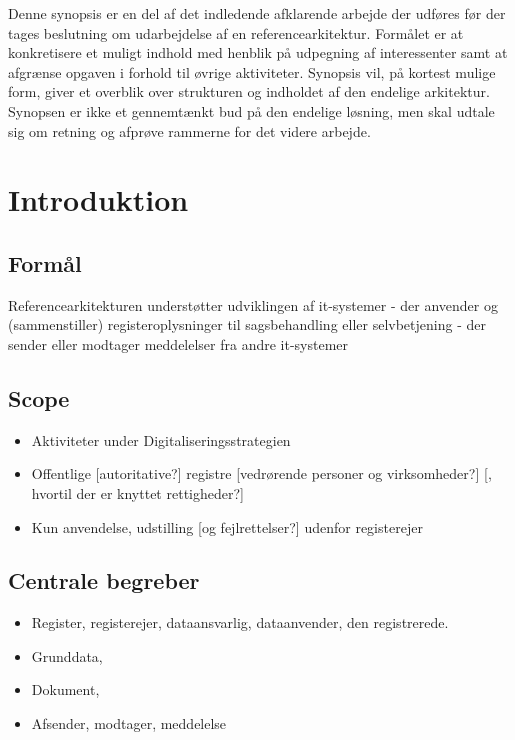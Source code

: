 Denne synopsis er en del af det indledende afklarende arbejde der
udføres før der tages beslutning om udarbejdelse af en
referencearkitektur. Formålet er at konkretisere et muligt indhold med
henblik på udpegning af interessenter samt at afgrænse opgaven i forhold
til øvrige aktiviteter. Synopsis vil, på kortest mulige form, giver et
overblik over strukturen og indholdet af den endelige arkitektur.
Synopsen er ikke et gennemtænkt bud på den endelige løsning, men skal
udtale sig om retning og afprøve rammerne for det videre arbejde.

\section{Introduktion}\label{introduktion}

\subsection{Formål}\label{formuxe5l}

Referencearkitekturen understøtter udviklingen af it-systemer - der
anvender og (sammenstiller) registeroplysninger til sagsbehandling eller
selvbetjening - der sender eller modtager meddelelser fra andre
it-systemer

\subsection{Scope}\label{scope}

\begin{itemize}
\tightlist
\item
  Aktiviteter under Digitaliseringsstrategien
\item
  Offentlige {[}autoritative?{]} registre {[}vedrørende personer og
  virksomheder?{]} {[}, hvortil der er knyttet rettigheder?{]}
\item
  Kun anvendelse, udstilling {[}og fejlrettelser?{]} udenfor
  registerejer
\end{itemize}

\subsection{Centrale begreber}\label{centrale-begreber}

\begin{itemize}
\tightlist
\item
  Register, registerejer, dataansvarlig, dataanvender, den registrerede.
\item
  Grunddata,
\item
  Dokument,
\item
  Afsender, modtager, meddelelse
\end{itemize}

